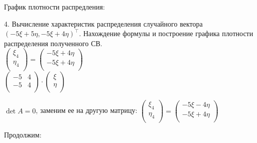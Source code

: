 \documentclass{article}
\begin{document}
График плотности распредления:\\


\newpage

4. Вычисление характеристик распределения случайного вектора $(-5\xi+5\eta, -5\xi+4\eta)^\top$. Нахождение формулы и построение графика плотности распределения полученного СВ.\\

$\left(
  	{\begin{array}{c}
    		\xi_{4}\\
    		\eta_{4}\\
  	\end{array}}
\right)
=
\left(
  	{\begin{array}{c}
    		-5\xi+4\eta\\
    		-5\xi+4\eta\\
  	\end{array}}
\right)
$\\

$
\left(
  	{\begin{array}{cc}
    	-5 & 4\\
    	-5 & 4\\
  	\end{array}}
\right)
\cdot
\left(
  	{\begin{array}{c}
    		\xi\\
    		\eta\\
  	\end{array}}
\right)
$

$\det A=0$, заменим ее на другую матрицу:
$\left(
  	{\begin{array}{c}
    		\xi_{4}\\
    		\eta_{4}\\
  	\end{array}}
\right)
=
\left(
  	{\begin{array}{c}
    		-5\xi-4\eta\\
    		-5\xi+4\eta\\
  	\end{array}}
\right)
$

Продолжим:\\
\end{document}
